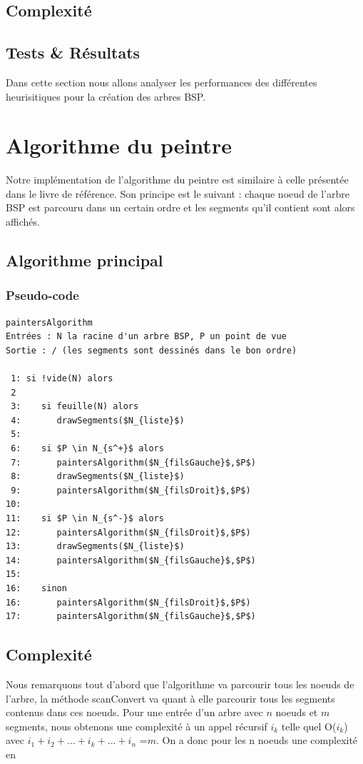 \documentclass[11pt,a4paper]{article}
\theoremstyle{definition}
\theoremstyle{remark}
\begin{document}
\subsection{Complexité}

\subsection{Tests \& Résultats}

Dans cette section nous allons analyser les performances des différentes heurisitiques pour la création des arbres BSP. \\

\section{Algorithme du peintre}

Notre implémentation de l'algorithme du peintre est similaire à celle présentée dans le livre de référence. Son principe est le suivant : chaque noeud de l'arbre BSP est parcouru dans un certain ordre et les segments qu'il contient sont alors affichés.

\subsection{Algorithme principal}
\subsubsection{Pseudo-code}
\begin{lstlisting}
paintersAlgorithm
Entrées : N la racine d'un arbre BSP, P un point de vue
Sortie : / (les segments sont dessinés dans le bon ordre)

 1: si !vide(N) alors
 2
 3:    si feuille(N) alors
 4:       drawSegments($N_{liste}$)
 5:
 6:    si $P \in N_{s^+}$ alors
 7:       paintersAlgorithm($N_{filsGauche}$,$P$)
 8:       drawSegments($N_{liste}$)
 9:       paintersAlgorithm($N_{filsDroit}$,$P$)
10:
11:    si $P \in N_{s^-}$ alors
12:       paintersAlgorithm($N_{filsDroit}$,$P$)
13:       drawSegments($N_{liste}$)
14:       paintersAlgorithm($N_{filsGauche}$,$P$)
15:
16:    sinon
16:       paintersAlgorithm($N_{filsDroit}$,$P$)
17:       paintersAlgorithm($N_{filsGauche}$,$P$)
\end{lstlisting}

\subsection{Complexité}
Nous remarquons tout d'abord que l'algorithme va parcourir tous les noeuds de l'arbre, la méthode scanConvert va quant à elle parcourir tous les segments contenus dans ces noeuds. Pour une entrée d'un arbre avec $n$ noeuds et $m$ segments, nous obtenons une complexité à un appel récursif $i_k$ telle quel O($i_k$) avec $i_1 + i_2 + ... + i_k + ... + i_n$ =$m$. On a donc pour les n noeuds une complexité en 
\end{document}
